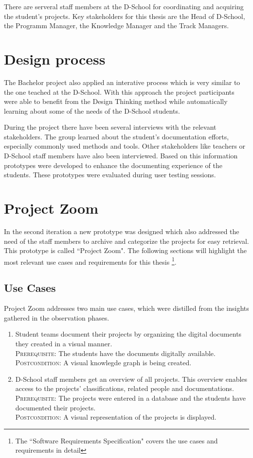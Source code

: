 There are serveral staff members at the D-School for coordinating and acquiring the student's projects. Key stakeholders for this thesis are the Head of D-School, the Programm Manager, the Knowledge Manager and the Track Managers.

\section{Design process}
The Bachelor project also applied an interative process which is very similar to the one teached at the D-School. With this approach the project participants were able to benefit from the Design Thinking method while automatically learning about some of the needs of the D-School students.

During the project there have been several interviews with the relevant stakeholders. The group learned about the student's documentation efforts, especially commonly used methods and tools. Other stakeholders like teachers or D-School staff members have also been interviewed. Based on this information prototypes were developed to enhance the documenting experience of the students. These prototypes were evaluated during user testing sessions.

\section{Project Zoom}
In the second iteration a new prototype was designed which also addressed the need of the staff members to archive and categorize the projects for easy retrieval. This prototype is called ``Project Zoom". The following sections will highlight the most relevant use cases and requirements for this thesis \footnote{The ``Software Requirements Specification"\cite{ReqSpec} covers the use cases and requirements in detail}.

\subsection{Use Cases}
Project Zoom addresses two main use cases, which were distilled from the insights gathered in the observation phases.

\begin{enumerate}
\item Student teams document their projects by organizing the digital documents they created in a visual manner.\\
\textsc{Prerequisite}: The students have the documents digitally available.\\
\textsc{Postcondition}: A visual knowlegde graph is being created.

\item D-School staff members get an overview of all projects. This overview enables access to the projects' classifications, related people and documentations.\\
\textsc{Prerequisite}: The projects were entered in a database and the students have documented their projects.\\
\textsc{Postcondition}: A visual representation of the projects is displayed.
\end{enumerate}

